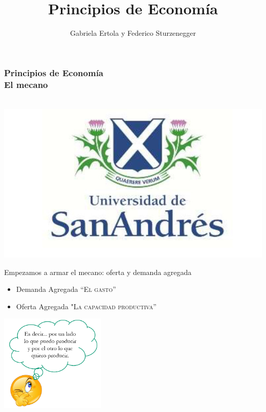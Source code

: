 \documentclass{beamer}
\title[Principios de Economía]{Principios de Economía}
\date{}
\author[Ertola y Sturzenegger]{Gabriela Ertola y Federico Sturzenegger }
\institute[]{Universidad de San Andrés \\
2022}
\begin{document}
\begin{frame}
\frametitle{Principios de Economía
\centering
\\ \vspace{12mm} El mecano}
\centering
 \\ \vspace{12mm} %
\includegraphics[scale=0.25]{Figures/logoUDESA.jpg} 

\end{frame}

\begin{frame}{Empezamos a armar el mecano: oferta y demanda agregada}

    \begin{itemize}
        \item Demanda Agregada \textsc{“El gasto”} \faCartPlus
        \item Oferta Agregada \textsc{"La capacidad productiva”} \faIndustry
    \end{itemize}
    \vspace{3mm}
    
    \centering\includegraphics[width=5cm]{Figures/P17b.png}\

\end{frame}
\end{document}
